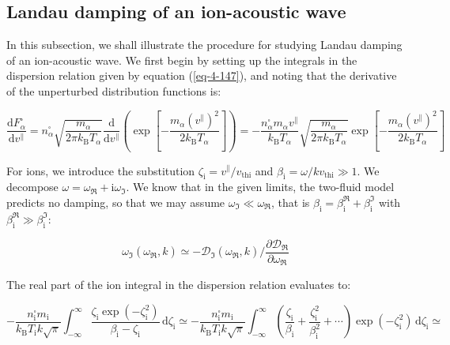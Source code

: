 \subsection{Landau damping of an ion-acoustic wave}

In this subsection, we shall illustrate the procedure for studying Landau damping of an ion-acoustic wave. We first begin by setting up the integrals in the dispersion relation given by equation (\ref{eq-4-147}), and noting that the derivative of the unperturbed distribution functions is:

\begin{equation}
    \frac{\mathrm{d}F_\alpha^\square}{\mathrm{d}v^\parallel}=n_\alpha^\square\sqrt{\frac{m_\alpha}{2\pi k_\mathrm{B}T_\alpha}}\frac{\mathrm{d}}{\mathrm{d}v^\parallel}\left(\exp{\left[-\frac{m_\alpha (v^\parallel)^2}{2k_\mathrm{B}T_\alpha}\right]}\right)=-\frac{n_\alpha^\square m_\alpha v^\parallel}{k_\mathrm{B}T_\alpha}\sqrt{\frac{m_\alpha}{2\pi k_\mathrm{B}T_\alpha}}\exp{\left[-\frac{m_\alpha(v^\parallel)^2}{2k_\mathrm{B}T_\alpha}\right]}
\end{equation}

For ions, we introduce the substitution $\zeta_\mathrm{i}=v^\parallel/v_\text{thi}$ and $\beta_\mathrm{i}=\omega/kv_\text{thi}\gg1$. We decompose $\omega=\omega_{\Re}+\mathrm{i}\omega_{\Im}$. We know that in the given limits, the two-fluid model predicts no damping, so that we may assume $\omega_{\Im}\ll\omega_{\Re}$, that is $\beta_\mathrm{i}=\beta_\mathrm{i}^{\Re}+\beta_\mathrm{i}^{\Im}$ with $\beta_\mathrm{i}^{\Re}\gg\beta_\mathrm{i}^{\Im}$:

\begin{equation}
    \omega_{\Im}(\omega_{\Re},k)\simeq-\mathcal{D}_{\Im}(\omega_{\Re},k)\bigg/\frac{\partial \mathcal{D}_{\Re}}{\partial \omega_{\Re}}
\end{equation}

The real part of the ion integral in the dispersion relation evaluates to:

\begin{equation}
    -\frac{n_\mathrm{i}^\square m_\mathrm{i}}{k_\mathrm{B}T_\mathrm{i}k\sqrt{\pi}}\int_{-\infty}^\infty\frac{\zeta_\mathrm{i}\exp{(-\zeta_\mathrm{i}^2)}}{\beta_\mathrm{i}-\zeta_\mathrm{i}}\,\mathrm{d}\zeta_\mathrm{i}\simeq-\frac{n_\mathrm{i}^\square m_\mathrm{i}}{k_\mathrm{B}T_\mathrm{i}k\sqrt{\pi}}\int_{-\infty}^\infty\left(\frac{\zeta_\mathrm{i}}{\beta_\mathrm{i}}+\frac{\zeta_\mathrm{i}^2}{\beta_\mathrm{i}^2}+\cdots\right)\exp{(-\zeta_\mathrm{i}^2)}\,\mathrm{d}\zeta_\mathrm{i}\simeq
\end{equation}

